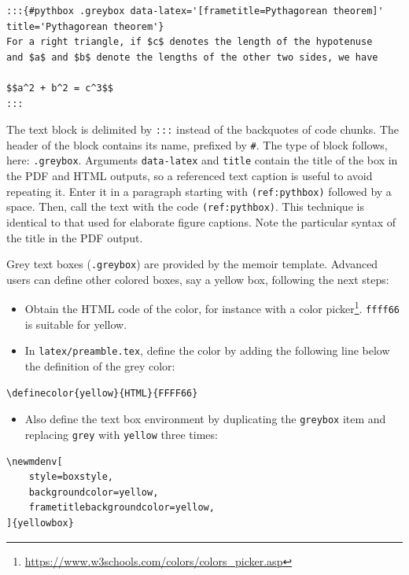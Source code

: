 \documentclass[
  12pt,
  american,
  a4paper,
  extrafontsizes,onecolumn,openright
  ]{memoir}
\providecommand{\tightlist}{%
  \setlength{\itemsep}{0pt}\setlength{\parskip}{0pt}}
\begin{document}
\begin{verbatim}
:::{#pythbox .greybox data-latex='[frametitle=Pythagorean theorem]'
title='Pythagorean theorem'}
For a right triangle, if $c$ denotes the length of the hypotenuse
and $a$ and $b$ denote the lengths of the other two sides, we have

$$a^2 + b^2 = c^3$$
:::
\end{verbatim}

The text block is delimited by \texttt{:::} instead of the backquotes of code chunks.
The header of the block contains its name, prefixed by \texttt{\#}.
The type of block follows, here: \texttt{.greybox}.
Arguments \texttt{data-latex} and \texttt{title} contain the title of the box in the PDF and HTML outputs, so a referenced text caption is useful to avoid repeating it.
Enter it in a paragraph starting with \texttt{(ref:pythbox)} followed by a space.
Then, call the text with the code \texttt{(ref:pythbox)}.
This technique is identical to that used for elaborate figure captions.
Note the particular syntax of the title in the PDF output.

Grey text boxes (\texttt{.greybox}) are provided by the memoir template.
Advanced users can define other colored boxes, say a yellow box, following the next steps:

\begin{itemize}
\tightlist
\item
  Obtain the HTML code of the color, for instance with a color picker\footnote{\url{https://www.w3schools.com/colors/colors_picker.asp}}. \texttt{ffff66} is suitable for yellow.
\item
  In \texttt{latex/preamble.tex}, define the color by adding the following line below the definition of the grey color:
\end{itemize}

\begin{verbatim}
\definecolor{yellow}{HTML}{FFFF66}
\end{verbatim}

\begin{itemize}
\tightlist
\item
  Also define the text box environment by duplicating the \texttt{greybox} item and replacing \texttt{grey} with \texttt{yellow} three times:
\end{itemize}

\begin{verbatim}
\newmdenv[
    style=boxstyle,
    backgroundcolor=yellow,
    frametitlebackgroundcolor=yellow,
]{yellowbox}
\end{verbatim}
\end{document}
